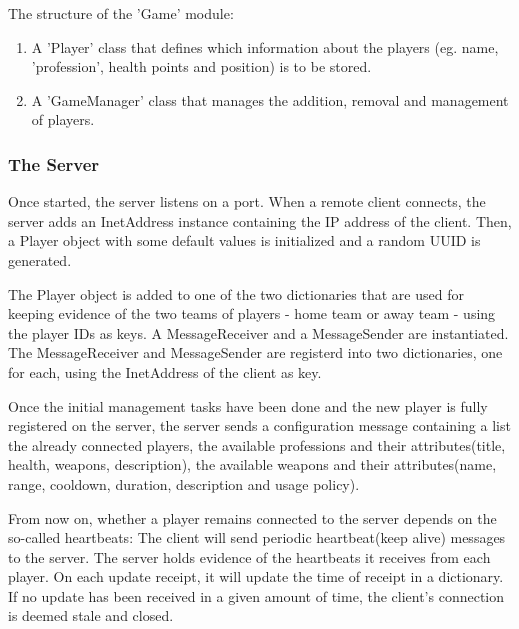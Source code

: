 The structure of the 'Game' module:

\begin{enumerate}
  
  \item A 'Player' class that defines which information about the players
  (eg. name, 'profession', health points and position) is to be stored.
  
  \item A 'GameManager' class that manages the addition, removal and management
  of players.
  
\end{enumerate}

\subsubsection{The Server}

Once started, the server listens on a port. When a remote client connects, the
server adds an InetAddress instance containing the IP address of the client.
Then, a Player object with some default values is initialized and a random UUID
is generated.\newline

The Player object is added to one of the two dictionaries that are used for
keeping evidence of the two teams of players - home team or away team - using
the player IDs as keys. A MessageReceiver and a MessageSender are instantiated.
The MessageReceiver and MessageSender are registerd into two dictionaries, one
for each, using the InetAddress of the client as key.\newline

Once the initial management tasks have been done and the new player is fully
registered on the server, the server sends a configuration message containing a
list the already connected players, the available professions and their
attributes(title, health, weapons, description), the available weapons and their
attributes(name, range, cooldown, duration, description and usage
policy).\newline

From now on, whether a player remains connected to the server depends on the
so-called heartbeats: The client will send periodic heartbeat(keep alive)
messages to the server. The server holds evidence of the heartbeats it
receives from each player. On each update receipt, it will update the time of
receipt in a dictionary. If no update has been received in a given amount of
time, the client's connection is deemed stale and closed. \newline

